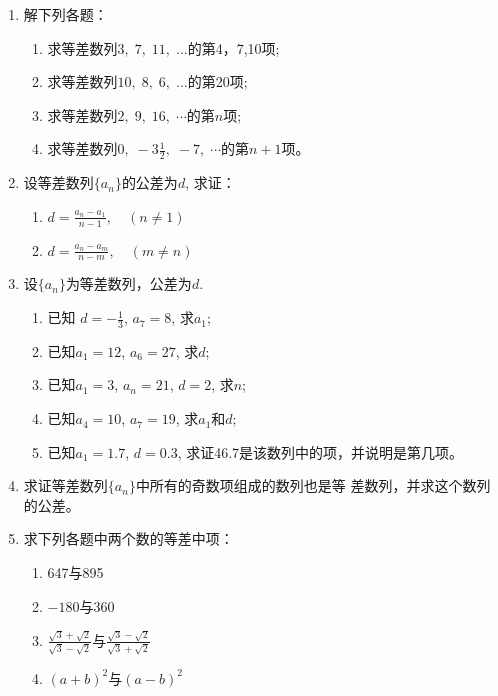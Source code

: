 \begin{ex}
\begin{enumerate}
    \item 解下列各题：
\begin{enumerate}[(1)]
\item 求等差数列$3,\; 7,\; 11,\; \ldots$的第4，7,10项;
\item 求等差数列$10,\; 8,\; 6,\; \ldots$的第20项;
\item 求等差数列$2,\; 9,\; 16,\; \cdots$的第$n$项;
\item 求等差数列$0,\; -3\frac{1}{2},\; -7,\; \cdots$的第$n+1$项。
\end{enumerate}

\item 设等差数列$\{a_n\}$的公差为$d$, 求证：
\begin{enumerate}[(1)]
\item $d= \frac {a_{n}- a_{1}}{n- 1},\quad \left ( n\neq 1\right ) $     
\item $d= \frac {a_{n}- a_{m}}{n- m},\quad ( m\neq n) $
\end{enumerate}

\item 设$\{a_n\}$为等差数列，公差为$d$.
\begin{enumerate}[(1)]
\item 已知 $d=-\frac{1}{3}$, $a_{7}=8$, 求$a_1$;
\item 已知$a_{1}=12$, $a_{6}=27$, 求$d$;
\item  已知$a_1=3$, $a_n=21$, $d=2$, 求$n$; 
\item 已知$a_4=10$, $a_7=19$, 求$a_1$和$d$;
\item 已知$a_1=1.7$, $d=0.3$, 求证46.7是该数列中的项，并说明是第几项。
\end{enumerate}
\item 求证等差数列$\{a_n\}$中所有的奇数项组成的数列也是等 差数列，并求这个数列的公差。
\item 求下列各题中两个数的等差中项：
\begin{multicols}{2}
\begin{enumerate}[(1)]
    \item 647与895
    \item $-180$与360
    \item $\frac{\sqrt{3}+\sqrt{2}}{\sqrt{3}-\sqrt{2}}$与$\frac{\sqrt{3}-\sqrt{2}}{\sqrt{3}+\sqrt{2}}$
    \item $(a+b)^2$与$(a-b)^2$
\end{enumerate}    
\end{multicols}
\end{enumerate}
\end{ex}

